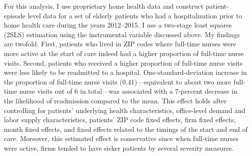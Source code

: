 \documentclass[final,12pt]{article}
\begin{document}
For this analysis, I use proprietary home health data and construct patient-episode level data for a set of elderly patients who had a hospitalization prior to home health care during the years 2012--2015. I use a two-stage least squares (2SLS) estimation using the instrumental variable discussed above.
My findings are twofold.
First, patients who lived in ZIP codes where full-time nurses were more active at the start of care indeed had a higher proportion of full-time nurse visits.
Second, patients who received a higher proportion of full-time nurse visits were less likely to be readmitted to a hospital.
One-standard-deviation increase in the proportion of full-time nurse visits (0.41)---equivalent to about two more full-time nurse visits out of 6 in total---was associated with a 7-percent decrease in the likelihood of readmission compared to the mean.
This effect holds after controlling for patients' underlying health characteristics, office-level demand and labor supply characteristics, patients' ZIP code fixed effects, firm fixed effects, month fixed effects, and fixed effects related to the timings of the start and end of care.
Moreover, this estimated effect is conservative since when full-time nurses were active, firms tended to have sicker patients by several severity measures.
\end{document}
